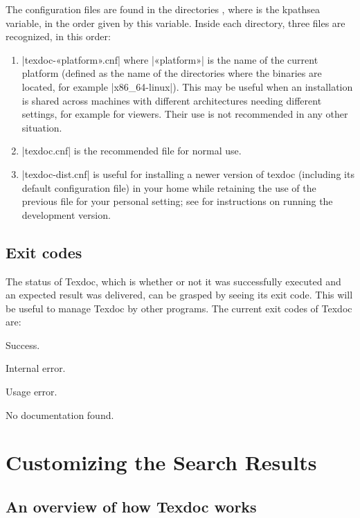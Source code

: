 \documentclass{texdoc-doc}
\begin{document}
The configuration files are found in the directories , where
 is the kpathsea variable, in the order given by this variable.
Inside each directory, three files are recognized, in this order:
%
\begin{enumerate}
\item |texdoc-«platform».cnf| where |«platform»| is the name of the current
  platform (defined as the name of the directories where the {\TL}
  binaries are located, for example |x86_64-linux|). This may be useful when
  an installation is shared across machines with different architectures
  needing different settings, for example for viewers. Their use is not
  recommended in any other situation.
\item |texdoc.cnf| is the recommended file for normal use.
\item |texdoc-dist.cnf| is useful for installing a newer version of texdoc
  (including its default configuration file) in your home while retaining
  the use of the previous file for your personal setting; see
  {\TexdocRepo} for instructions on running the development version.
\end{enumerate}

\subsection{Exit codes}
\label{sec:exit}

The status of Texdoc, which is whether or not it was successfully executed and
an expected result was delivered, can be grasped by seeing its exit code. This
will be useful to manage Texdoc by other programs. The current exit codes of
Texdoc are:
%
\begin{description}[left=2em]
\item[\code{0}] Success.
\item[\code{1}] Internal error.
\item[\code{2}] Usage error.
\item[\code{3}] No documentation found.
\end{description}

\section{Customizing the Search Results}

\subsection{An overview of how Texdoc works}
\end{document}
